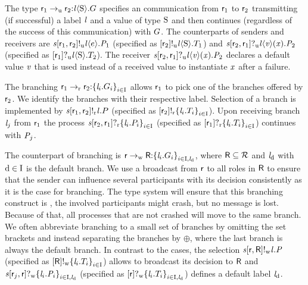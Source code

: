 The type $ \GComU{\Role_1}{\Role_2}{\Label}{\Sort}{\GT} $ specifies an \unrel communication from $ \Role_1 $ to $ \Role_2 $ transmitting (if successful) a label $ \Label $ and a value of type $ \Sort $ and then continues (regardless of the success of this communication) with $ \GT $.
The \unrel counterparts of senders and receivers are $ \PSendU{\Chan}{\Role_1}{\Role_2}{\Label}{\Expr}{\PT_1} $ (specified as $ \LSendU{\Role_2}{\Label}{\Sort}{\LT_1} $) and $ \PGetU{\Chan}{\Role_2}{\Role_1}{\Label}{\Args[v]}{\Args}{\PT_2} $ (specified as $ \LGetU{\Role_1}{\Label}{\Sort}{\LT_2} $).
The receiver $ \PGetU{\Chan}{\Role_2}{\Role_1}{\Label}{\Args[v]}{\Args}{\PT_2} $ declares a default value $ \Args[v] $ that is used instead of a received value to instantiate $ \Args $ after a failure.

The \strongR branching $ \GBranR{\Role_1}{\Role_2}{\Set{ \Label_i.\GT_i}_{i \in \indexSet}} $ allows $ \Role_1 $ to pick one of the branches offered by $ \Role_2 $.
We identify the branches with their respective label.
Selection of a branch is implemented by $ \PSelR{\Chan}{\Role_1}{\Role_2}{\Label}{P} $ (specified as $ \LSelR{\Role_2}{\Set{ \Label_i.\LT_i }_{i \in \indexSet}} $).
Upon receiving branch $ \Label_j $ from $ \Role_1 $ the process $ \PBranR{\Chan}{\Role_2}{\Role_1}{\Set{ \Label_i.P_i }_{i \in \indexSet}} $ (specified as $ \LBranR{\Role_1}{\Set{ \Label_i.\LT_i }_{i \in \indexSet}} $) continues with $ \PT_j $.

The \weakR counterpart of branching is $ \GBranW{\Role}{\Role[R]}{\Set{\Label_i.\GT_i}_{i \in \indexSet, \LabelD}} $, where $ \Role[R] \subseteq \roles $ and $ \LabelD $ with $ \default \in \indexSet $ is the default branch.
We use a broadcast from $ \Role $ to all roles in $ \Role[R] $ to ensure that the sender can influence several participants with its decision consistently as it is the case for \strongR branching.
The type system will ensure that this branching construct is \weakR, \ie the involved participants might crash, but no message is lost.
Because of that, all processes that are not crashed will move to the same branch.
We often abbreviate branching \wrt to a small set of branches by omitting the set brackets and instead separating the branches by $ \oplus $, where the last branch is always the default branch.
In contrast to the \strongR cases, the \weakR selection $ \PSelW{\Chan}{\Role}{\Role[R]}{\Label}{\PT} $ (specified as $ \LSelW{\Role[R]}{\Set{ \Label_i.\LT_i }_{i \in \indexSet}} $) allows to broadcast its decision to $ \Role[R] $ and $ \PBranW{\Chan}{\Role_j}{\Role}{\Set{ \Label_i.\PT_i }_{i \in \indexSet, \LabelD}} $ (specified as $ \LBranW{\Role}{\Set{ \Label_i.\LT_i }_{i \in \indexSet, \LabelD}} $) defines a default label $ \LabelD $.

